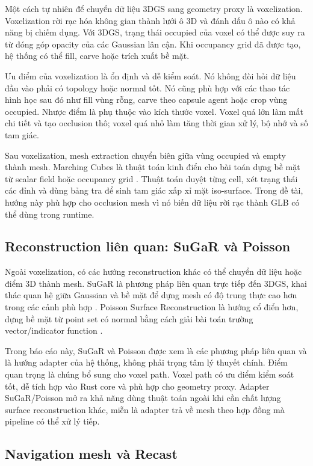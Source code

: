 Một cách tự nhiên để chuyển dữ liệu 3DGS sang geometry proxy là voxelization. Voxelization rời rạc hóa không gian thành lưới ô 3D và đánh dấu ô nào có khả năng bị chiếm dụng. Với 3DGS, trạng thái occupied của voxel có thể được suy ra từ đóng góp opacity của các Gaussian lân cận. Khi occupancy grid đã được tạo, hệ thống có thể fill, carve hoặc trích xuất bề mặt.

Ưu điểm của voxelization là ổn định và dễ kiểm soát. Nó không đòi hỏi dữ liệu đầu vào phải có topology hoặc normal tốt. Nó cũng phù hợp với các thao tác hình học sau đó như fill vùng rỗng, carve theo capsule agent hoặc crop vùng occupied. Nhược điểm là phụ thuộc vào kích thước voxel. Voxel quá lớn làm mất chi tiết và tạo occlusion thô; voxel quá nhỏ làm tăng thời gian xử lý, bộ nhớ và số tam giác.

Sau voxelization, mesh extraction chuyển biên giữa vùng occupied và empty thành mesh. Marching Cubes là thuật toán kinh điển cho bài toán dựng bề mặt từ scalar field hoặc occupancy grid \cite{MarchingCubes1987}. Thuật toán duyệt từng cell, xét trạng thái các đỉnh và dùng bảng tra để sinh tam giác xấp xỉ mặt iso-surface. Trong đề tài, hướng này phù hợp cho occlusion mesh vì nó biến dữ liệu rời rạc thành GLB có thể dùng trong runtime.

\subsection{Reconstruction liên quan: SuGaR và Poisson}

Ngoài voxelization, có các hướng reconstruction khác có thể chuyển dữ liệu hoặc điểm 3D thành mesh. SuGaR là phương pháp liên quan trực tiếp đến 3DGS, khai thác quan hệ giữa Gaussian và bề mặt để dựng mesh có độ trung thực cao hơn trong các cảnh phù hợp \cite{SuGaR2024}. Poisson Surface Reconstruction là hướng cổ điển hơn, dựng bề mặt từ point set có normal bằng cách giải bài toán trường vector/indicator function \cite{Poisson2006}.

Trong báo cáo này, SuGaR và Poisson được xem là các phương pháp liên quan và là hướng adapter của hệ thống, không phải trọng tâm lý thuyết chính. Điểm quan trọng là chúng bổ sung cho voxel path. Voxel path có ưu điểm kiểm soát tốt, dễ tích hợp vào Rust core và phù hợp cho geometry proxy. Adapter SuGaR/Poisson mở ra khả năng dùng thuật toán ngoài khi cần chất lượng surface reconstruction khác, miễn là adapter trả về mesh theo hợp đồng mà pipeline có thể xử lý tiếp.

\subsection{Navigation mesh và Recast}

